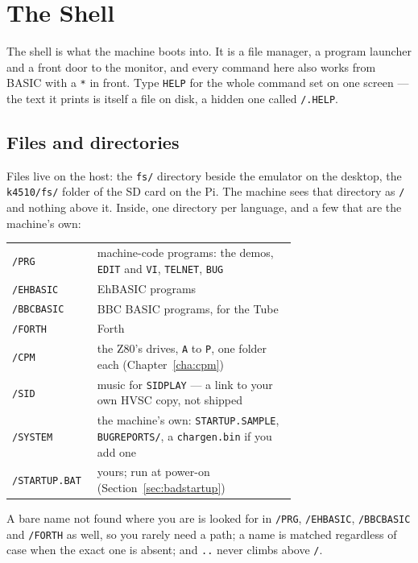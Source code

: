 \chapter{The Shell}\label{cha:shell}

The shell is what the machine boots into. It is a file manager, a program
launcher and a front door to the monitor, and every command here also works
from BASIC with a \verb|*| in front. Type \verb|HELP| for the whole command
set on one screen --- the text it prints is itself a file on disk, a hidden
one called \verb|/.HELP|.

\section{Files and directories}
Files live on the host: the \texttt{fs/} directory beside the emulator on
the desktop, the \texttt{k4510/fs/} folder of the SD card on the Pi. The
machine sees that directory as \texttt{/} and nothing above it. Inside,
one directory per language, and a few that are the machine's own:

\begin{center}
\small
\begin{tabular}{@{}l >{\raggedright\arraybackslash}p{0.70\linewidth}@{}}
\toprule
\texttt{/PRG} & machine-code programs: the demos, \texttt{EDIT} and \texttt{VI}, \texttt{TELNET}, \texttt{BUG} \\
\texttt{/EHBASIC} & EhBASIC programs \\
\texttt{/BBCBASIC} & BBC BASIC programs, for the Tube \\
\texttt{/FORTH} & Forth \\
\texttt{/CPM} & the Z80's drives, \texttt{A} to \texttt{P}, one folder each (Chapter~\ref{cha:cpm}) \\
\texttt{/SID} & music for \texttt{SIDPLAY} --- a link to your own HVSC copy, not shipped \\
\texttt{/SYSTEM} & the machine's own: \texttt{STARTUP.SAMPLE}, \texttt{BUGREPORTS/}, a \texttt{chargen.bin} if you add one \\
\texttt{/STARTUP.BAT} & yours; run at power-on (Section~\ref{sec:badstartup}) \\
\bottomrule
\end{tabular}
\end{center}

A bare name not found where you are is looked for in \texttt{/PRG},
\texttt{/EHBASIC}, \texttt{/BBCBASIC} and \texttt{/FORTH} as well, so
you rarely need a path; a name is matched regardless of case when the
exact one is absent; and \texttt{..} never climbs above \texttt{/}.

